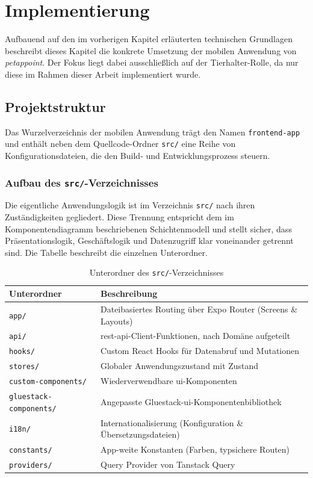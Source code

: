 \chapter{Implementierung}
\label{chap:implementierung}

Aufbauend auf den im vorherigen Kapitel erläuterten technischen Grundlagen beschreibt dieses Kapitel die konkrete Umsetzung der mobilen Anwendung von \textit{petappoint}. Der Fokus liegt dabei ausschließlich auf der Tierhalter-Rolle, da nur diese im Rahmen dieser Arbeit implementiert wurde.

\section{Projektstruktur}

Das Wurzelverzeichnis der mobilen Anwendung trägt den Namen \texttt{frontend-app} und enthält neben dem Quellcode-Ordner \texttt{src/} eine Reihe von Konfigurationsdateien, die den Build- und Entwicklungsprozess steuern. 

\subsection{Aufbau des \texttt{src/}-Verzeichnisses}

Die eigentliche Anwendungslogik ist im Verzeichnis \texttt{src/} nach ihren Zuständigkeiten gegliedert. Diese Trennung entspricht dem im Komponentendiagramm beschriebenen Schichtenmodell und stellt sicher, dass Präsentationslogik, Geschäftslogik und Datenzugriff klar voneinander getrennt sind. Die Tabelle beschreibt die einzelnen Unterordner.

\begin{table}[H]
\begin{tabular}{|p{4.5cm}|p{9.2cm}|}
\hline
\textbf{Unterordner} & \textbf{Beschreibung} \\
\hline
\texttt{app/}                  & Dateibasiertes Routing über Expo Router (Screens \& Layouts) \\
\hline
\texttt{api/}                  & \gls{rest}-\gls{api}-Client-Funktionen, nach Domäne aufgeteilt \\
\hline
\texttt{hooks/}                & Custom React Hooks für Datenabruf und Mutationen \\
\hline
\texttt{stores/}               & Globaler Anwendungszustand mit Zustand \\
\hline
\texttt{custom-components/}    & Wiederverwendbare \gls{ui}-Komponenten \\
\hline
\texttt{gluestack-components/} & Angepasste Gluestack-\gls{ui}-Komponentenbibliothek \\
\hline
\texttt{i18n/}                 & Internationalisierung (Konfiguration \& Übersetzungsdateien) \\
\hline
\texttt{constants/}            & App-weite Konstanten (Farben, typsichere Routen) \\
\hline
\texttt{providers/}            & Query Provider von Tanstack Query \\
\hline
\end{tabular}
\caption{Unterordner des \texttt{src/}-Verzeichnisses}
\label{tab:src-structure}
\end{table} 

